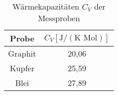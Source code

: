 \begin{table}[h]
	\begin{center}
		\begin{tabular}{cc}
		  	Probe&$C_V [\text{J}/(\text{K } \text{Mol})]$ \\ \hline
			Graphit&20,06\\
			Kupfer&25,59\\
			Blei&27,89
		\end{tabular}
		\caption{Wärmekapazitäten $C_V$ der Messproben}
		\label{tabdiss1}
	\end{center}
\end{table}
